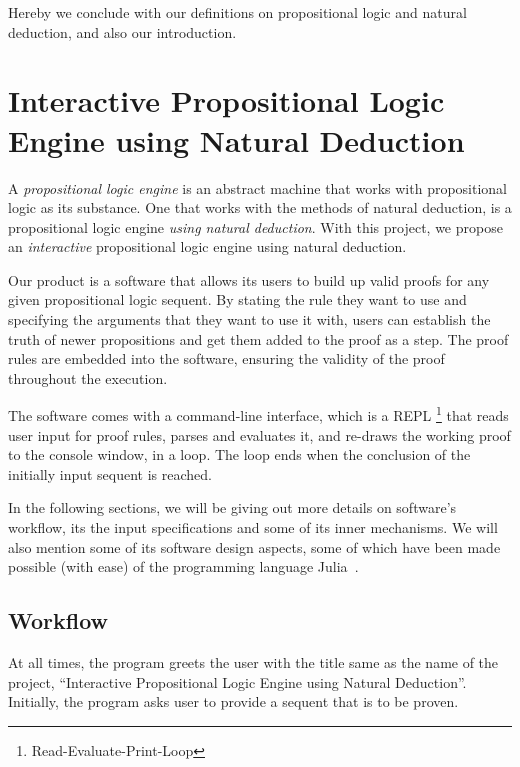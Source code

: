 \documentclass{article}
\begin{document}
Hereby we conclude with our definitions on propositional logic
and natural deduction, and also our introduction.

\section{Interactive Propositional Logic Engine using Natural Deduction}

A \textit{propositional logic engine} is an abstract machine that
works with propositional logic as its substance. One that works
with the methods of natural deduction, is a propositional logic
engine \textit{using natural deduction}. With this project,
we propose an \textit{interactive} propositional logic engine
using natural deduction.

Our product is a software that allows its users to build up valid proofs
for any given propositional logic sequent. By stating the rule they
want to use and specifying the arguments that they want to use it with,
users can establish the truth of newer propositions and get them added
to the proof as a step. The proof rules are embedded into the software,
ensuring the validity of the proof throughout the execution.

The software comes with a command-line interface, which is a REPL%
\footnote{Read-Evaluate-Print-Loop}
that reads user input for proof rules, parses and evaluates it, and
re-draws the working proof to the console window, in a loop. The
loop ends when the conclusion of the initially input sequent is reached.

In the following sections, we will be giving out more details on
software's workflow, its the input specifications and some of its
inner mechanisms. We will also mention some of its software design
aspects, some of which have been made possible (with ease) of the
programming language Julia~\cite{julia}.

\subsection{Workflow}

At all times, the program greets the user with the title same as the
name of the project, ``Interactive Propositional Logic Engine using
Natural Deduction''. Initially, the program asks user to provide
a sequent that is to be proven.
\end{document}
